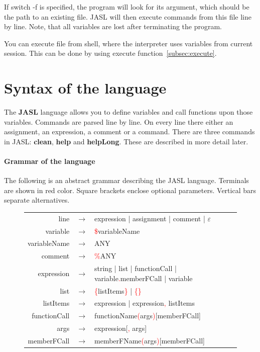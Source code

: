 \documentclass{ctuthesis}
\begin{document}
If switch -f is specified, the program will look for its argument, which should be the path to an existing file. JASL will then execute commands from this file line by line. Note, that all variables are lost after terminating the program. 

You can execute file from shell, where the interpreter uses variables from current session. This can be done by using execute function~\ref{subsec:execute}. 

\section{Syntax of the language}
\label{subsec:syntax}
The \textbf{JASL} language allows you to define variables and call functions upon those variables. Commands are parsed line by line. On every line there either an assignment, an expression, a comment or a command. There are three commands in JASL: \textbf{clean}, \textbf{help} and \textbf{helpLong}. These are described in more detail later.

\paragraph{Grammar of the language} The following is an abstract grammar describing the JASL language. Terminals are shown in red color. Square brackets enclose optional parameters. Vertical bars separate alternatives.

\begin{figure}[H]
\begin{ctucolortab}
\begin{tabular}{rcl}
	line &$\rightarrow$& expression | assignment | comment | $\varepsilon$ \\
	variable &$\rightarrow$& \textcolor{red}{\$}variableName\\
	variableName &$\rightarrow$& ANY \\
	comment &$\rightarrow$& \textcolor{red}{\%}ANY \\
	expression &$\rightarrow$& string | list | functionCall | variable\textcolor{red}{.}memberFCall | variable \\
	list &$\rightarrow$& \textcolor{red}{\{}listItems\textcolor{red}{\}} | \textcolor{red}{\{}\textcolor{red}{\}} \\
	listItems &$\rightarrow$& expression | expression\textcolor{red}{,} listItems \\
	functionCall &$\rightarrow$& functionName\textcolor{red}{(}args\textcolor{red}{)}[memberFCall] \\
	args &$\rightarrow$& expression[\textcolor{red}{,} args] \\
	memberFCall &$\rightarrow$& memberFName\textcolor{red}{(}args\textcolor{red}{)}[memberFCall]
\end{tabular}
\end{ctucolortab}
\end{figure}
\end{document}
